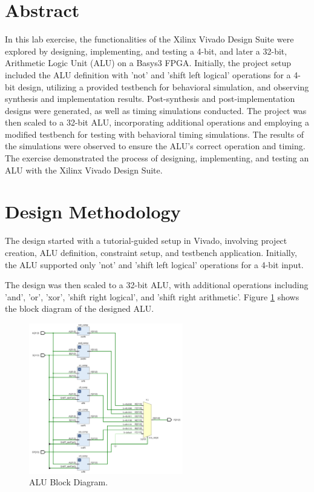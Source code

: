 \documentclass[CMPE]{../KGCOEReport}
\begin{document}
\maketitle

\section*{Abstract}

In this lab exercise, the functionalities of the Xilinx Vivado Design Suite were explored by designing, implementing, and testing a 4-bit, and later a 32-bit, Arithmetic Logic Unit (ALU) on a Basys3 FPGA. Initially, the project setup included the ALU definition with 'not' and 'shift left logical' operations for a 4-bit design, utilizing a provided testbench for behavioral simulation, and observing synthesis and implementation results. Post-synthesis and post-implementation designs were generated, as well as timing simulations conducted. The project was then scaled to a 32-bit ALU, incorporating additional operations and employing a modified testbench for testing with behavioral timing simulations. The results of the simulations were observed to ensure the ALU's correct operation and timing. The exercise demonstrated the process of designing, implementing, and testing an ALU with the Xilinx Vivado Design Suite.

\section*{Design Methodology}

The design started with a tutorial-guided setup in Vivado, involving project creation, ALU definition, constraint setup, and testbench application. Initially, the ALU supported only 'not' and 'shift left logical' operations for a 4-bit input.

The design was then scaled to a 32-bit ALU, with additional operations including 'and', 'or', 'xor', 'shift right logical', and 'shift right arithmetic'. Figure \ref{fig:alu} shows the block diagram of the designed ALU.

\begin{figure}[H]
    \centering
    \includegraphics[width=0.6\textwidth]{alu.png}
    \caption{ALU Block Diagram.}
    \label{fig:alu}
\end{figure}
\end{document}
